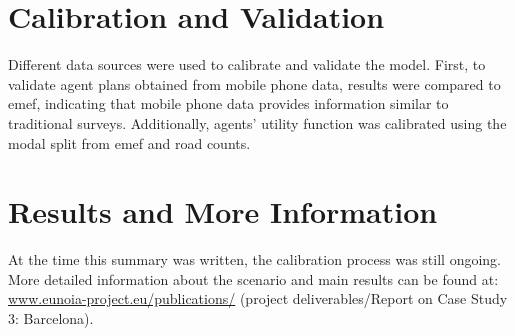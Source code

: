 \section{Calibration and Validation}
Different data sources were used to calibrate and validate the model. First, to validate agent plans obtained from mobile phone data, results were compared to \gls{emef}, indicating that mobile phone data provides information similar to traditional surveys. Additionally, agents' utility function was calibrated using the modal split from \gls{emef} and road counts.

\section{Results and More Information}
At the time this summary was written, the calibration process was still ongoing. More detailed information about the scenario and main results can be found at:
\url{www.eunoia-project.eu/publications/} (project deliverables/Report on Case Study 3: Barcelona).

